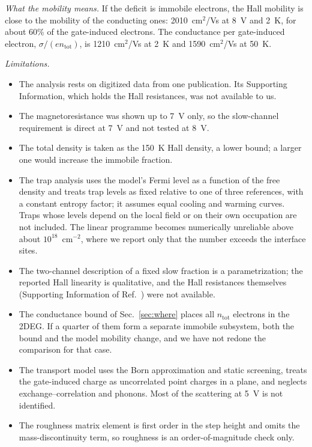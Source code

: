 \documentclass[11pt]{article}
\newcommand{\ntot}{n_\mathrm{tot}}
\begin{document}
\emph{What the mobility means.} If the deficit is immobile electrons, the Hall mobility is close to the mobility of the conducting ones: 2010~cm$^2$/Vs at 8~V and 2~K, for about 60\% of the gate-induced electrons. The conductance per gate-induced electron, $\sigma/(e\ntot)$, is 1210~cm$^2$/Vs at 2~K and 1590~cm$^2$/Vs at 50~K.

\emph{Limitations.}
\begin{itemize}
\item The analysis rests on digitized data from one publication. Its Supporting Information, which holds the Hall resistances, was not available to us.
\item The magnetoresistance was shown up to 7~V only, so the slow-channel requirement is direct at 7~V and not tested at 8~V.
\item The total density is taken as the 150~K Hall density, a lower bound; a larger one would increase the immobile fraction.
\item The trap analysis uses the model's Fermi level as a function of the free density and treats trap levels as fixed relative to one of three references, with a constant entropy factor; it assumes equal cooling and warming curves. Traps whose levels depend on the local field or on their own occupation are not included. The linear programme becomes numerically unreliable above about $10^{18}$~cm$^{-2}$, where we report only that the number exceeds the interface sites.
\item The two-channel description of a fixed slow fraction is a parametrization; the reported Hall linearity is qualitative, and the Hall resistances themselves (Supporting Information of Ref.~\cite{Lee2024LIO}) were not available.
\item The conductance bound of Sec.~\ref{sec:where} places all $\ntot$ electrons in the 2DEG. If a quarter of them form a separate immobile subsystem, both the bound and the model mobility change, and we have not redone the comparison for that case.
\item The transport model uses the Born approximation and static screening, treats the gate-induced charge as uncorrelated point charges in a plane, and neglects exchange--correlation and phonons. Most of the scattering at 5~V is not identified.
\item The roughness matrix element is first order in the step height and omits the mass-discontinuity term, so roughness is an order-of-magnitude check only.
\end{itemize}
\end{document}
